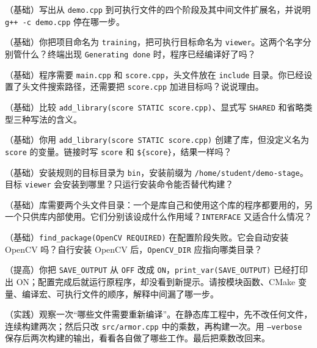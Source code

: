 \documentclass[
  lang=cn,
  scheme=chinese,
  chinesefont=ctexfont,
  11pt,
  oneside,
  device=normal,
  color=cyan,
  mode=fancy
]{../templates/elegantbook}
\begin{document}
\begin{problemset}
\item\label{prob:v1-build-1} （基础）写出从 \texttt{demo.cpp} 到可执行文件的四个阶段及其中间文件扩展名，并说明 \texttt{g++ -c demo.cpp} 停在哪一步。
\item\label{prob:v1-build-2} （基础）你把项目命名为 \texttt{training}，把可执行目标命名为 \texttt{viewer}。这两个名字分别管什么？终端出现 \texttt{Generating done} 时，程序已经编译好了吗？
\item\label{prob:v1-build-3} （基础）程序需要 \texttt{main.cpp} 和 \texttt{score.cpp}，头文件放在 \texttt{include} 目录。你已经设置了头文件搜索路径，还需要把 \texttt{score.cpp} 加进目标吗？说说理由。
\item\label{prob:v1-build-4} （基础）比较 \texttt{add\_library(score STATIC score.cpp)}、显式写 \texttt{SHARED} 和省略类型三种写法的含义。
\item\label{prob:v1-build-5} （基础）你用 \texttt{add\_library(score STATIC score.cpp)} 创建了库，但没定义名为 \texttt{score} 的变量。链接时写 \texttt{score} 和 \texttt{\$\{score\}}，结果一样吗？
\item\label{prob:v1-build-6} （基础）安装规则的目标目录为 \texttt{bin}，安装前缀为 \texttt{/home/student/demo-stage}。目标 \texttt{viewer} 会安装到哪里？只运行安装命令能否替代构建？
\item\label{prob:v1-build-7} （基础）库需要两个头文件目录：一个是库自己和使用这个库的程序都要用的，另一个只供库内部使用。它们分别该设成什么作用域？\texttt{INTERFACE} 又适合什么情况？
\item\label{prob:v1-build-8} （基础）\texttt{find\_package(OpenCV REQUIRED)} 在配置阶段失败。它会自动安装 OpenCV 吗？自行安装 OpenCV 后，\texttt{OpenCV\_DIR} 应指向哪类目录？
\item\label{prob:v1-build-9} （提高）你把 \texttt{SAVE\_OUTPUT} 从 \texttt{OFF} 改成 \texttt{ON}，\texttt{print\_var(SAVE\_OUTPUT)} 已经打印出 ON；配置完成后就运行原程序，却没看到新提示。请按模块函数、CMake 变量、编译宏、可执行文件的顺序，解释中间漏了哪一步。
\item\label{prob:v1-build-10} （实践）观察一次“哪些文件需要重新编译”。在静态库工程中，先不改任何文件，连续构建两次；然后只改 \texttt{src/armor.cpp} 中的乘数，再构建一次。用 \texttt{--verbose} 保存后两次构建的输出，看看各自做了哪些工作。最后把乘数改回来。
\end{problemset}
\end{document}
